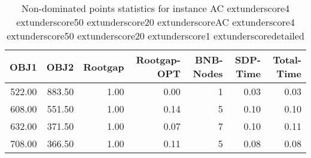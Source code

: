 \begin{table}
\caption{Non-dominated points statistics for instance AC	extunderscore4	extunderscore50	extunderscore20	extunderscoreAC	extunderscore4	extunderscore50	extunderscore20	extunderscore1	extunderscoredetailed}
\label{tab:stats/AC_4_50_20_AC_4_50_20_1_detailed}
\begin{tabular}{rrrrrrr}
\toprule
OBJ1 & OBJ2 & Rootgap & Rootgap-OPT & BNB-Nodes & SDP-Time & Total-Time \\
\midrule
522.00 & 883.50 & 1.00 & 0.00 & 1 & 0.03 & 0.03 \\
608.00 & 551.50 & 1.00 & 0.14 & 5 & 0.10 & 0.10 \\
632.00 & 371.50 & 1.00 & 0.07 & 7 & 0.10 & 0.11 \\
708.00 & 366.50 & 1.00 & 0.11 & 5 & 0.08 & 0.08 \\
\bottomrule
\end{tabular}
\end{table}
